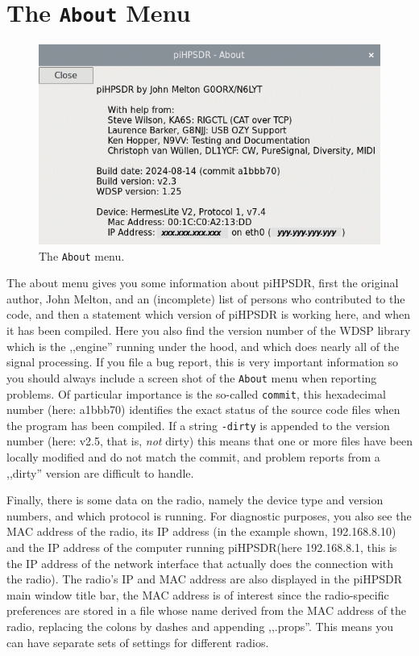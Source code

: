\documentclass[12pt]{book}
\def\rett#1{\texttt{\color{red}#1}}
\def\bltt#1{\texttt{\color{blue}#1}}
\def\pH{pi\-HPSDR\xspace}
\begin{document}
\clearpage
\section{The \texttt{About} Menu}

\begin{figure}[ht]
\center
\includegraphics[scale=0.45]{AboutMenu.png}
\caption{The \bltt{About} menu.}
\end{figure}

The about menu gives you some information about \pH, first the original author,
John Melton,
and an (incomplete) list
of persons who contributed to the code, and then a statement which version of \pH
is working here, and when it has been compiled. Here you also find the version number of the WDSP
library which is the ,,engine''
running under the hood, and which does nearly all of the signal processing. If you file a bug report,
this is very important information so you should always include a screen shot of the \bltt{About}
menu when reporting problems. Of particular importance is the so-called \rett{commit},
this hexadecimal number (here: a1bbb70) identifies the exact status of the source code files
when the program has been compiled. If a string \texttt{-dirty} is appended to the version number
(here: v2.5, that is, \textit{not} dirty) this means that one or more files have been locally  modified
and do not match the commit, and problem reports from a ,,dirty'' version are difficult to handle.

Finally, there is
some data on the radio, namely the device type and version numbers, and which protocol is running.
For diagnostic purposes, you also see the MAC address of the radio, its IP address (in the
example shown, 192.168.8.10) and the
IP address of the computer running \pH (here 192.168.8.1, this is the IP address of the network
interface that actually does the connection with the radio).
The radio's IP and MAC address are also displayed in the \pH main window title bar,
the MAC address is of interest since the radio-specific
preferences are stored in a file whose name derived from the MAC address of the radio, replacing
the colons by dashes and appending ,,.props''. This means you can have separate sets of settings
for different radios.
\end{document}
